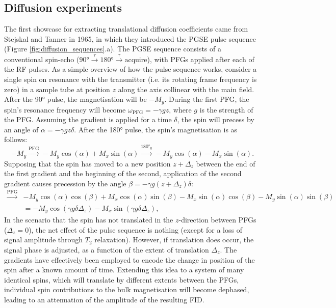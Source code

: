 \subsection{Diffusion experiments}
\label{sec:diffusion_experiments}

The first showcase for extracting translational diffusion coefficients came
from Stejskal and Tanner in 1965, in which they introduced the \ac{PGSE} pulse
sequence\cite{Stejskal1965} (Figure \ref{fig:diffusion_sequences}.a).
The \ac{PGSE} sequence consists of a conventional spin-echo ($\ang{90}
\xrightarrow{\tau} \ang{180} \xrightarrow{\tau} \text{acquire}$), with
\acp{PFG} applied after each of the \ac{RF} pulses.
As a simple overview of how the pulse sequence works, consider a single spin on
resonance with the transmitter (i.e. its rotating frame frequency is zero) in a
sample tube at position $z$ along the axis collinear with the main field.
After the \ang{90} pulse, the magnetisation will be $-M_y$.
During the first \ac{PFG}, the spin's resonance frequency will become
$\omega_{\text{PFG}} = -\gamma g z$, where $g$ is the strength of the \ac{PFG}.
Assuming the gradient is applied for a time $\delta$, the spin will
precess by an angle of  $\alpha = -\gamma g z \delta$. After the \ang{180}
pulse, the spin's magnetisation is as follows:
\[
    -M_y
    \xrightarrow{\text{PFG}} -M_y \cos(\alpha) + M_x \sin(\alpha)
    \xrightarrow{\ang{180}_y} -M_y \cos(\alpha) - M_x \sin(\alpha).
\]
Supposing that the spin has moved to a new position $z + \Delta_z$
between the end of the first gradient and the beginning of the second,
application of the second gradient causes precession by the angle
$\beta = -\gamma g (z + \Delta_z) \delta$:
\begin{equation*}
   \begin{split}
        \xrightarrow{\text{PFG}}
            &-M_y \cos(\alpha)\cos(\beta) +
            M_x \cos(\alpha)\sin(\beta) -
            M_x \sin(\alpha)\cos(\beta) -
            M_y \sin(\alpha)\sin(\beta)\\
        &= -M_y \cos(\gamma g \delta \Delta_z) -
           M_x \sin(\gamma g \delta \Delta_z),
   \end{split}
\end{equation*}
In the scenario that the spin has not translated in the $z$-direction between
\acp{PFG} ($\Delta_z = 0$), the net effect of the pulse sequence is nothing
(except for a loss of signal amplitude through $T_2$ relaxation). However, if
translation does occur, the signal phase is adjusted, as a function of the
extent of translation $\Delta_z$. The gradients have effectively been employed
to encode the change in position of the spin after a known amount of time.
Extending this idea to a system of many identical spins, which will translate
by different extents between the \acp{PFG}, individual spin contributions to
the bulk magnetisation will become dephased, leading to an attenuation of the
amplitude of the resulting FID.

